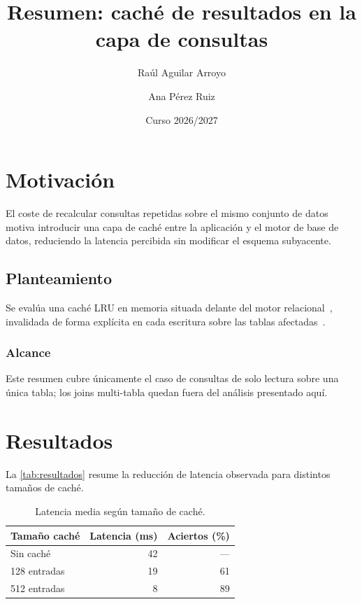 \documentclass[10pt]{article}
\title{Resumen: caché de resultados en la capa de consultas}
\author{Raúl Aguilar Arroyo \and Ana Pérez Ruiz}
\date{Curso 2026/2027}
\begin{document}
\maketitle

\section{Motivación}

El coste de recalcular consultas repetidas sobre el mismo conjunto de datos
motiva introducir una capa de caché entre la aplicación y el motor de base
de datos, reduciendo la latencia percibida sin modificar el esquema
subyacente.

\subsection{Planteamiento}

Se evalúa una caché LRU en memoria situada delante del motor
relacional~\cite{megiddo2003}, invalidada de forma explícita en cada
escritura sobre las tablas afectadas~\cite{silberschatz2019}.

\subsubsection{Alcance} Este resumen cubre únicamente el caso de consultas
de solo lectura sobre una única tabla; los joins multi-tabla quedan fuera
del análisis presentado aquí.

\section{Resultados}

La \autoref{tab:resultados} resume la reducción de latencia observada para
distintos tamaños de caché.

\begin{table}[h]
  \centering
  \caption{Latencia media según tamaño de caché.}
  \label{tab:resultados}
  \begin{tabular}{@{}lrr@{}}
    \toprule
    Tamaño caché & Latencia (ms) & Aciertos (\%) \\
    \midrule
    Sin caché & 42 & --- \\
    128 entradas & 19 & 61 \\
    512 entradas & 8 & 89 \\
    \bottomrule
  \end{tabular}
\end{table}
\end{document}
